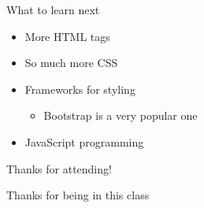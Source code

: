 \documentclass{beamer}
\begin{document}
\begin{frame}[label={sec:orgheadline94}]{What to learn next}
\begin{itemize}
\item More HTML tags \pause
\item So much more CSS \pause
\item Frameworks for styling \pause
\begin{itemize}
\item Bootstrap is a very popular one \pause
\end{itemize}
\item JavaScript programming
\end{itemize}
\end{frame}
\begin{frame}[label={sec:orgheadline95}]{Thanks for attending!}
\begin{block}{}
{\Huge
Thanks for being in this class
}
\end{block}
\end{frame}
\end{document}
